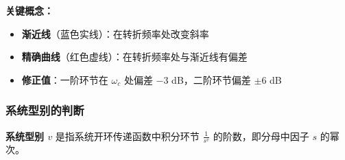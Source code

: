 \vspace{0.3cm}
\textbf{关键概念：}
\begin{itemize}
    \item \textbf{渐近线}（蓝色实线）：在转折频率处改变斜率
    \item \textbf{精确曲线}（红色虚线）：在转折频率处与渐近线有偏差
    \item \textbf{修正值}：一阶环节在 $\omega_c$ 处偏差 $-3$ dB，二阶环节偏差 $\pm 6$ dB
\end{itemize}

\subsubsection{系统型别的判断}

\textbf{系统型别 $v$} 是指系统开环传递函数中积分环节 $\displaystyle\frac{1}{s^v}$ 的阶数，即分母中因子 $s$ 的幂次。

